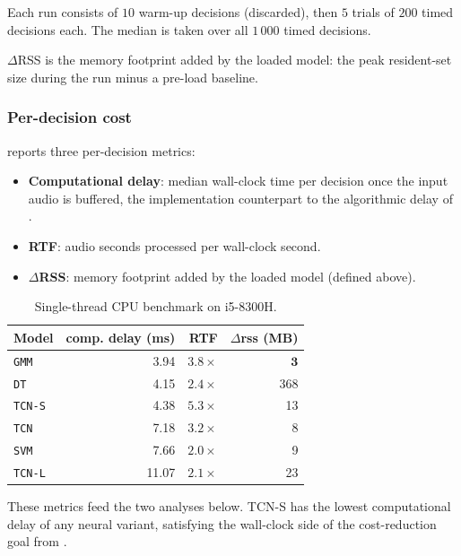 Each run consists of $10$ warm-up decisions (discarded), then $5$ trials of $200$ timed decisions each.
The median is taken over all $1\,000$ timed decisions.

$\Delta$RSS is the memory footprint added by the loaded model: the peak resident-set size during the run minus a pre-load baseline.

\subsubsection{Per-decision cost}

 reports three per-decision metrics:
\begin{itemize}
    \item \textbf{Computational delay}: median wall-clock time per decision once the input audio is buffered, the implementation counterpart to the algorithmic delay of .
    \item \textbf{RTF}: audio seconds processed per wall-clock second.
    \item \textbf{$\Delta$RSS}: memory footprint added by the loaded model (defined above).
\end{itemize}

\begin{table}[h]
\centering
\small
\begin{tabular}{lrrr}
\toprule
\textbf{Model} & \textbf{comp. delay (ms)} & \textbf{RTF} & \textbf{$\Delta$rss (MB)} \\
\midrule
\texttt{GMM}        & 3.94 & $3.8\times$ & $\mathbf{3}$ \\
\texttt{DT}         & 4.15 & $2.4\times$ & 368 \\
\texttt{TCN-S}      & 4.38 & $\mathbf{5.3\times}$ & 13 \\
\texttt{TCN}        & 7.18 & $3.2\times$ & 8 \\
\texttt{SVM}        & 7.66 & $2.0\times$ & 9 \\
\texttt{TCN-L}      & 11.07 & $2.1\times$ & 23 \\
\bottomrule
\end{tabular}
\caption{Single-thread CPU benchmark on i5-8300H.}
\label{tab:complexity_t1_results}
\end{table}

These metrics feed the two analyses below.
TCN-S has the lowest computational delay of any neural variant, satisfying the wall-clock side of the cost-reduction goal from .

